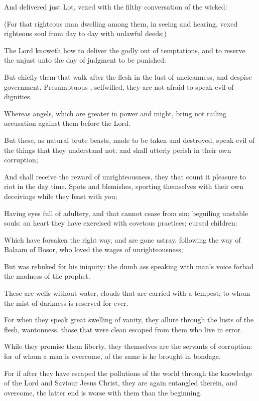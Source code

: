 {And
delivered
just
Lot,
vexed
with the
filthy
conversation of the
wicked:

(For that righteous
man
dwelling
among
them, in
seeing
and
hearing,
vexed
{}
righteous
soul
from
day
to
day
with
{}
unlawful
deeds;)

The
Lord knoweth
how to
deliver the
godly out
of
temptations,
and to
reserve the
unjust
unto the
day of
judgment to be
punished:

But
chiefly them that
walk
after the
flesh
in the
lust of
uncleanness,
and
despise
government.
Presumptuous
{},
selfwilled, they
are
not
afraid to speak evil
of
dignities.

Whereas
angels, which
are
greater in
power
and
might,
bring
not
railing
accusation
against
them
before the
Lord.

But
these,
as
natural
brute
beasts,
made
to be
taken
and
destroyed, speak
evil
of the things
that they understand
not; and shall utterly
perish
in their
own
corruption;

And shall
receive the
reward of
unrighteousness,
{} they that count
it
pleasure to
riot
in the day
time.
Spots
{}
and
blemishes, sporting
themselves
with their
own
deceivings while they feast
with
you;

Having
eyes
full of
adultery,
and that cannot
cease from
sin;
beguiling
unstable
souls: an
heart they have
exercised with covetous
practices;
cursed
children:

Which have
forsaken the
right
way, and are gone
astray,
following the
way of
Balaam
{} of
Bosor,
who
loved the
wages of
unrighteousness;

But
was
rebuked
for
his
iniquity:
the
dumb
ass
speaking
with
man’s
voice
forbad the
madness of the
prophet.

These
are
wells without
water,
clouds that are
carried
with a
tempest; to
whom the
mist of
darkness is
reserved
for
ever.

For when they
speak great
swelling
{} of
vanity, they
allure
through the
lusts of the
flesh,
{}
wantonness, those that were
clean
escaped from them who
live
in
error.

While they
promise
them
liberty, they
themselves
are the
servants of
corruption:
for of
whom a
man is
overcome, of the
same is he brought in
bondage.

For
if after they have
escaped the
pollutions of the
world
through the
knowledge of the
Lord
and
Saviour
Jesus
Christ, they
are
again
entangled
therein, and
overcome, the latter
end
is
worse with
them than the
beginning.

}
